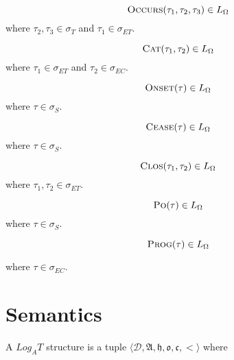 

\[
	\textsc{Occurs}(\tau_1, \tau_2, \tau_3) \in L_{\Omega}
\]
where $\tau_2, \tau_3 \in \sigma_T$  and $\tau_1 \in \sigma_{ET}$.

\[
	\textsc{Cat}(\tau_1, \tau_2) \in L_{\Omega}
\]
where $\tau_1 \in \sigma_{ET}$ and $\tau_2 \in \sigma_{EC}$.

\[
	\textsc{Onset}(\tau) \in L_{\Omega}
\]
where $\tau \in \sigma_S$.

\[
	\textsc{Cease}(\tau) \in L_{\Omega}
\]
where $\tau \in \sigma_S$.

\[
	\textsc{Clos}(\tau_1, \tau_2) \in L_{\Omega}
\]
where $\tau_1, \tau_2 \in \sigma_{ET}$.

\[
	\textsc{Po}(\tau) \in L_{\Omega}
\]
where $\tau \in \sigma_S$.

\[
	\textsc{Prog}(\tau) \in L_{\Omega}
\]

where $\tau \in \sigma_{EC}$.

\section{Semantics}

\begin{defn}
	A $Log_AT$ structure is a tuple $\langle \mathcal{D},\mathfrak{A}, \mathfrak{h}, \mathfrak{o}, \mathfrak{c}, <
		\rangle$ where
\end{defn}


